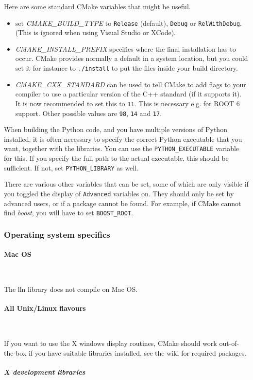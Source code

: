 \documentclass{article}
\newcommand{\subsubsubsection}[1]{\paragraph{#1}\mbox{} \\}
\newcommand{\subsubsubsubsection}[1]{\subparagraph{#1} \mbox{} \\}
\begin{document}
Here are some standard CMake variables that might be useful.
\begin{itemize}
\item set \textit{CMAKE\_BUILD\_TYPE} to \texttt{Release} (default), \texttt{Debug} or \texttt{RelWithDebug}.
(This is ignored when using Visual Studio or XCode).
\item \textit{CMAKE\_INSTALL\_PREFIX} specifies where the final installation has to occur. CMake
provides normally a default in a system location, but you could set it for instance to
\texttt{./install} to put the files inside your build directory.
\item \textit{CMAKE\_CXX\_STANDARD} can be used to tell CMake to add flags to your compiler to use
a particular version of the C++ standard (if it supports it). It is now recommended to set 
this to \texttt{11}. This is necessary e.g. for ROOT 6 support. Other possible values are
\texttt{98}, \texttt{14} and \texttt{17}.
\end{itemize}

When building the Python code, and you have multiple versions of Python installed,
it is often necessary to specify the correct Python executable that you want, together with
the libraries. You can use the \texttt{PYTHON\_EXECUTABLE} variable for this. If you
specify the full path to the actual executable, this should be sufficient. If not, set
\texttt{PYTHON\_LIBRARY} as well.

There are various other variables that can be set, some of which are only visible if you toggled
the display of \texttt{Advanced} variables on. They should only be set by advanced users, or if a package
cannot be found. For example, if CMake cannot find \textit{boost}, you will have to set \texttt{BOOST\_ROOT}.

\subsubsection{
Operating system specifics}

{ \subsubsubsection{Mac OS}
}

The lln library does not compile on Mac OS. 

{ \subsubsubsection{All Unix/Linux flavours}
}

If you want to use the X windows display routines,  CMake
should work out-of-the-box if you have suitable libraries installed, see the wiki
for required packages.

{ \subsubsubsubsection{X development libraries}
}
\end{document}
